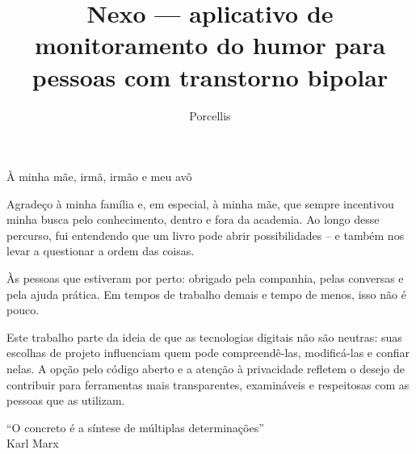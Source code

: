 \documentclass[tcc,capa,table]{textsi}
\title{Nexo --- aplicativo de monitoramento do humor para pessoas com transtorno bipolar}
\author{Porcellis}{Pedro Lucas}
\begin{document}


\maketitle

\sloppy

\fichacatalografica
\folhadeaprovacao

\begin{dedicatoria}
  À minha mãe, irmã, irmão e meu avô
\end{dedicatoria}

\begin{agradecimentos}

Agradeço à minha família e, em especial, à minha mãe, que sempre incentivou
minha busca pelo conhecimento, dentro e fora da academia. Ao longo desse
percurso, fui entendendo que um livro pode abrir possibilidades -- e também nos
levar a questionar a ordem das coisas.

\vspace{1em}
Às pessoas que estiveram por perto: obrigado pela companhia, pelas conversas
e pela ajuda prática. Em tempos de trabalho demais e tempo de menos, isso não
é pouco.

\vspace{1em}
Este trabalho parte da ideia de que as tecnologias digitais não são neutras:
suas escolhas de projeto influenciam quem pode compreendê-las, modificá-las
e confiar nelas. A opção pelo código aberto e a atenção à privacidade refletem
o desejo de contribuir para ferramentas mais transparentes, examináveis
e respeitosas com as pessoas que as utilizam.

\end{agradecimentos}

\begin{epigrafe}
	``O concreto é a síntese de múltiplas determinações'' \\
	Karl Marx
\end{epigrafe}
\end{document}
